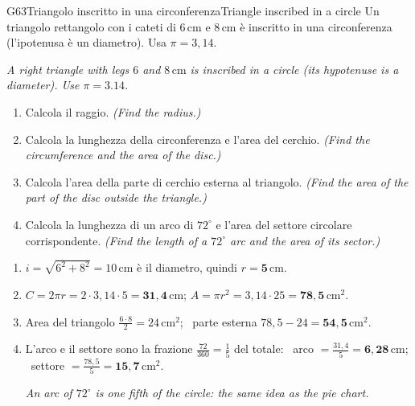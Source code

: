 \documentclass[11pt,a4paper]{article}
\newcommand{\en}[1]{\par{\small\itshape\color{engray}#1\par}}
\newcommand{\enx}[1]{{\small\itshape\color{engray}(#1)}}
\newcommand{\unit}[1]{\,\mathrm{#1}}
\newcommand{\cm}{\unit{cm}}
\newcommand{\cmq}{\unit{cm^2}}
\newcommand{\rang}[3]{\pic[draw, line width=0.5pt, angle radius=2.2mm] {right angle=#1--#2--#3};}
\begin{document}
\begin{esercizio}{G6}{3}{Triangolo inscritto in una circonferenza}{Triangle inscribed in a circle}
Un triangolo rettangolo con i cateti di $6\cm$ e $8\cm$ è inscritto in una circonferenza (l'ipotenusa è un diametro). Usa $\pi=3,14$.
\en{A right triangle with legs $6$ and $8\cm$ is inscribed in a circle (its hypotenuse is a diameter). Use $\pi = 3.14$.}
\begin{enumerate}
\item Calcola il raggio. \enx{Find the radius.}
\item Calcola la lunghezza della circonferenza e l'area del cerchio. \enx{Find the circumference and the area of the disc.}
\item Calcola l'area della parte di cerchio esterna al triangolo. \enx{Find the area of the part of the disc outside the triangle.}
\item Calcola la lunghezza di un arco di $72^\circ$ e l'area del settore circolare corrispondente. \enx{Find the length of a $72^\circ$ arc and the area of its sector.}
\end{enumerate}
\begin{center}
\end{center}
\end{esercizio}
\begin{solbox}
\begin{enumerate}
\item $i=\sqrt{6^2+8^2}=10\cm$ è il diametro, quindi $r=\mathbf{5\cm}$.
\item $C=2\pi r=2\cdot3,14\cdot5=\mathbf{31,4\cm}$; \quad $A=\pi r^2=3,14\cdot25=\mathbf{78,5\cmq}$.
\item Area del triangolo $\frac{6\cdot8}{2}=24\cmq$; \ parte esterna $78,5-24=\mathbf{54,5\cmq}$.
\item L'arco e il settore sono la frazione $\frac{72}{360}=\frac15$ del totale: \ arco $=\frac{31,4}{5}=\mathbf{6,28\cm}$; \ settore $=\frac{78,5}{5}=\mathbf{15,7\cmq}$.
\en{An arc of $72^\circ$ is one fifth of the circle: the same idea as the pie chart.}
\end{enumerate}
\end{solbox}
\end{document}
